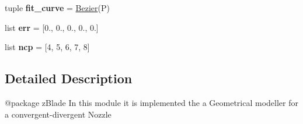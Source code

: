\begin{DoxyCompactItemize}
\item 
\hypertarget{namespacenozzle_a5bc67755f1e5646f0b68c3ba88303578}{tuple {\bfseries fit\-\_\-curve} = \hyperlink{classbezier_1_1Bezier}{\-Bezier}(\-P)}\label{namespacenozzle_a5bc67755f1e5646f0b68c3ba88303578}

\item 
\hypertarget{namespacenozzle_a6baec50da90b88388370c11b7a4a1d12}{list {\bfseries err} = \mbox{[}0., 0., 0., 0., 0.\mbox{]}}\label{namespacenozzle_a6baec50da90b88388370c11b7a4a1d12}

\item 
\hypertarget{namespacenozzle_a12153924299e0f7ddc24c73c167da400}{list {\bfseries ncp} = \mbox{[}4, 5, 6, 7, 8\mbox{]}}\label{namespacenozzle_a12153924299e0f7ddc24c73c167da400}

\end{DoxyCompactItemize}


\subsection{\-Detailed \-Description}
\begin{DoxyVerb}@package zBlade
In this module it is implemented the a Geometrical modeller for a convergent-divergent Nozzle    
\end{DoxyVerb}
 